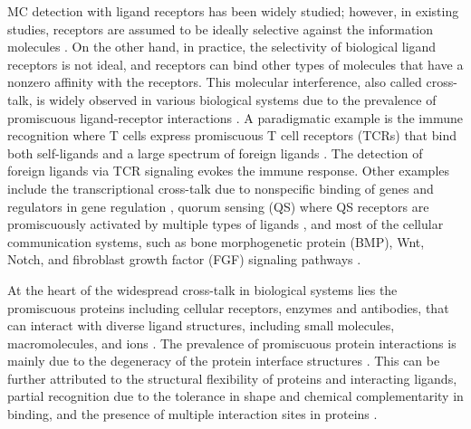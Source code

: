 \documentclass[twocolumn]{IEEEtran}
\begin{document}
MC detection with ligand receptors has been widely studied; however, in existing studies, receptors are assumed to be ideally selective against the information molecules \cite{kuscu2019transmitter}. On the other hand, in practice, the selectivity of biological ligand receptors is not ideal, and receptors can bind other types of molecules that have a nonzero affinity with the receptors.
This molecular interference, also called cross-talk, is widely observed in various biological systems due to the prevalence of promiscuous ligand-receptor interactions \cite{lalanne2015chemodetection, nobeli2009protein}. A paradigmatic example is the immune recognition where T cells express promiscuous T cell receptors (TCRs) that bind both self-ligands and a large spectrum of foreign ligands \cite{sewell2012must, baker2012structural}. The detection of foreign ligands via TCR signaling evokes the immune response. Other examples include the transcriptional cross-talk due to nonspecific binding of genes and regulators in gene regulation \cite{oeckinghaus2011crosstalk}, quorum sensing (QS) where QS receptors are promiscuously activated by multiple types of ligands \cite{wellington2019quorum}, and most of the cellular communication systems, such as bone morphogenetic protein (BMP), Wnt, Notch, and fibroblast growth factor (FGF) signaling pathways \cite{su2020ligand}.


At the heart of the widespread cross-talk in biological systems lies the promiscuous proteins including cellular receptors, enzymes and antibodies, that can interact with diverse ligand structures, including small molecules, macromolecules, and ions \cite{nobeli2009protein, tawfik2010enzyme, jain2019antibody}. The prevalence of promiscuous protein interactions is mainly due to the degeneracy of the protein interface structures \cite{gao2010structural}. This can be further attributed to the structural flexibility of proteins and interacting ligands, partial recognition due to the tolerance in shape and chemical complementarity in binding, and the presence of multiple interaction sites in proteins \cite{nobeli2009protein}.


\end{document}
